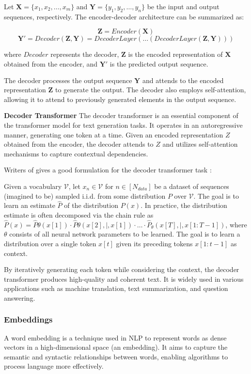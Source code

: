 \documentclass[a4paper,12pt]{article}
\begin{document}
Let $\mathbf{X} = \{x_1, x_2, \ldots, x_m\}$ and $\mathbf{Y} = \{y_1, y_2, \ldots, y_n\}$ be the input and output sequences, respectively. The encoder-decoder architecture can be summarized as:

$$\mathbf{Z} = Encoder(\mathbf{X})$$
$$\mathbf{Y'} = Decoder(\mathbf{Z}, \mathbf{Y}) = DecoderLayer(\ldots(DecoderLayer(\mathbf{Z}, \mathbf{Y})))$$

where $Decoder$ represents the decoder, $\mathbf{Z}$ is the encoded representation of $\mathbf{X}$ obtained from the encoder, and $\mathbf{Y'}$ is the predicted output sequence.

The decoder processes the output sequence $\mathbf{Y}$ and attends to the encoded representation $\mathbf{Z}$ to generate the output. The decoder also employs self-attention, allowing it to attend to previously generated elements in the output sequence.

\textbf{Decoder Transformer}
The decoder transformer is an essential component of the transformer model for text generation tasks. It operates in an autoregressive manner, generating one token at a time. Given an encoded representation $Z$ obtained from the encoder, 
the decoder attends to $Z$ and utilizes self-attention mechanisms to capture contextual dependencies.

Writers of \cite{formaltransformer} gives a good formulation for the decoder transformer task : 

Given a vocabulary $\mathcal{V}$, let $x_n \in \mathcal{V}$ for $n \in [N_{data}]$ be a dataset of sequences (imagined to be) sampled i.i.d. from some distribution $P$ over $\mathcal{V}$. 
The goal is to learn an estimate $\hat{P}$ of the distribution $P(x)$. 
In practice, the distribution estimate is often decomposed via the chain rule as $\hat{P}(x) = \hat{P}{\theta}(x[1]) \cdot \hat{P}{\theta}(x[2] ,|, x[1]) \cdot \ldots \cdot \hat{P}_{\theta}(x[T] ,|, x[1:T-1])$, 
where $\theta$ consists of all neural network parameters to be learned. 
The goal is to learn a distribution over a single token $x[t]$ given its preceding tokens $x[1:t-1]$ as context.

By iteratively generating each token while considering the context, the decoder transformer produces high-quality and coherent text. 
It is widely used in various applications such as machine translation, text summarization, and question answering.




\subsubsection{Embeddings}
A word embedding is a technique used in NLP to represent words as dense vectors in a high-dimensional space (an embedding). It aims to capture the semantic and syntactic relationships between words, enabling algorithms to process language more effectively.
\end{document}
